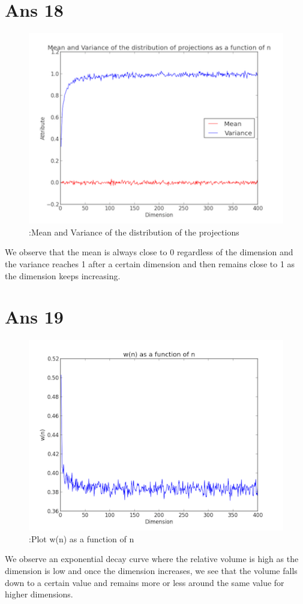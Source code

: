 \documentclass[10pt]{article}
\begin{document}
\begin{flushleft}
\begin{figure}[!htb]
\begin{floatrow}
    \end{floatrow}
\end{figure}
\end{flushleft}
\section*{Ans 18}
\begin{flushleft}
\begin{figure}[!htb]
\includegraphics{18.png}
\caption{:Mean and Variance of the distribution of the projections}
\end{figure}
We observe that the mean is always close to 0 regardless of the dimension and the variance reaches 1 after a certain dimension and then remains close to 1 as the dimension keeps increasing.
\end{flushleft}
\section*{Ans 19}
\begin{flushleft}
\begin{figure}[!htb]
\includegraphics{19.png}
\caption{:Plot w(n) as a function of n}
\end{figure}
We observe an exponential decay curve where the relative volume is high as the dimension is low and once the dimension increases, we see that the volume falls down to a certain value and remains more or less around the same value for higher dimensions.\\
\end{flushleft}
\end{document}
